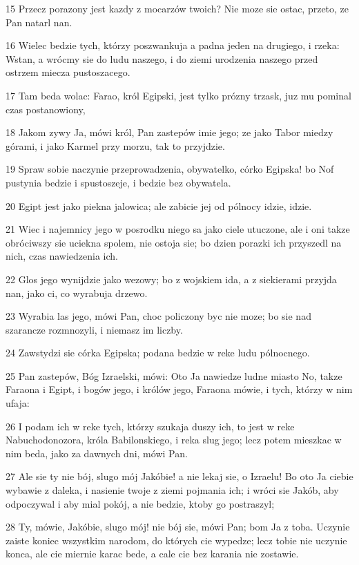 \par 15 Przecz porazony jest kazdy z mocarzów twoich? Nie moze sie ostac, przeto, ze Pan natarl nan.
\par 16 Wielec bedzie tych, którzy poszwankuja a padna jeden na drugiego, i rzeka: Wstan, a wrócmy sie do ludu naszego, i do ziemi urodzenia naszego przed ostrzem miecza pustoszacego.
\par 17 Tam beda wolac: Farao, król Egipski, jest tylko prózny trzask, juz mu pominal czas postanowiony,
\par 18 Jakom zywy Ja, mówi król, Pan zastepów imie jego; ze jako Tabor miedzy górami, i jako Karmel przy morzu, tak to przyjdzie.
\par 19 Spraw sobie naczynie przeprowadzenia, obywatelko, córko Egipska! bo Nof pustynia bedzie i spustoszeje, i bedzie bez obywatela.
\par 20 Egipt jest jako piekna jalowica; ale zabicie jej od pólnocy idzie, idzie.
\par 21 Wiec i najemnicy jego w posrodku niego sa jako ciele utuczone, ale i oni takze obróciwszy sie uciekna spolem, nie ostoja sie; bo dzien porazki ich przyszedl na nich, czas nawiedzenia ich.
\par 22 Glos jego wynijdzie jako wezowy; bo z wojskiem ida, a z siekierami przyjda nan, jako ci, co wyrabuja drzewo.
\par 23 Wyrabia las jego, mówi Pan, choc policzony byc nie moze; bo sie nad szarancze rozmnozyli, i niemasz im liczby.
\par 24 Zawstydzi sie córka Egipska; podana bedzie w reke ludu pólnocnego.
\par 25 Pan zastepów, Bóg Izraelski, mówi: Oto Ja nawiedze ludne miasto No, takze Faraona i Egipt, i bogów jego, i królów jego, Faraona mówie, i tych, którzy w nim ufaja:
\par 26 I podam ich w reke tych, którzy szukaja duszy ich, to jest w reke Nabuchodonozora, króla Babilonskiego, i reka slug jego; lecz potem mieszkac w nim beda, jako za dawnych dni, mówi Pan.
\par 27 Ale sie ty nie bój, slugo mój Jakóbie! a nie lekaj sie, o Izraelu! Bo oto Ja ciebie wybawie z daleka, i nasienie twoje z ziemi pojmania ich; i wróci sie Jakób, aby odpoczywal i aby mial pokój, a nie bedzie, ktoby go postraszyl;
\par 28 Ty, mówie, Jakóbie, slugo mój! nie bój sie, mówi Pan; bom Ja z toba. Uczynie zaiste koniec wszystkim narodom, do których cie wypedze; lecz tobie nie uczynie konca, ale cie miernie karac bede, a cale cie bez karania nie zostawie.

